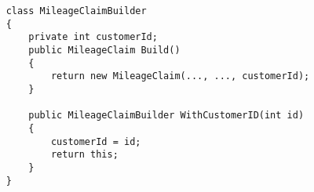 \begin{verbatim}
    class MileageClaimBuilder
    {
        private int customerId;
        public MileageClaim Build()
        {
            return new MileageClaim(..., ..., customerId);
        }
    
        public MileageClaimBuilder WithCustomerID(int id)
        {
            customerId = id;
            return this;
        }
    }
\end{verbatim}